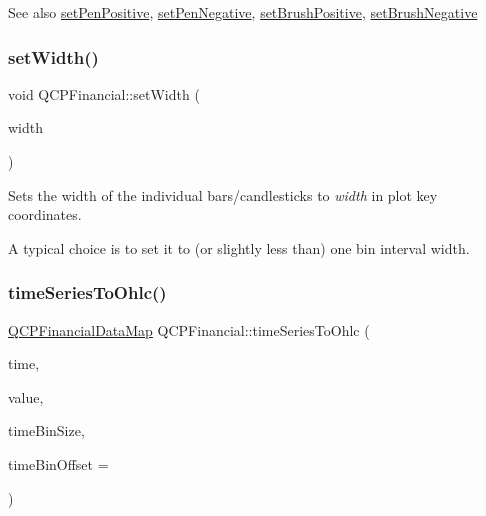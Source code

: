 \begin{DoxySeeAlso}{See also}
\hyperlink{class_q_c_p_financial_ac58aa3adc7a35aab0088764b840683e5}{set\+Pen\+Positive}, \hyperlink{class_q_c_p_financial_afe5c07e94ccea01a75b3a2476993c346}{set\+Pen\+Negative}, \hyperlink{class_q_c_p_financial_a5ebff2b1764efd07cc44942e67821829}{set\+Brush\+Positive}, \hyperlink{class_q_c_p_financial_a8bbdd87629f9144b3ef51af660c0961a}{set\+Brush\+Negative} 
\end{DoxySeeAlso}
\hypertarget{class_q_c_p_financial_a99633f8bac86a61d534ae5eeb1a3068f}{}\label{class_q_c_p_financial_a99633f8bac86a61d534ae5eeb1a3068f} 
\subsubsection{\texorpdfstring{set\+Width()}{setWidth()}}
{\footnotesize\ttfamily void Q\+C\+P\+Financial\+::set\+Width (\begin{DoxyParamCaption}\item[{double}]{width }\end{DoxyParamCaption})}

Sets the width of the individual bars/candlesticks to {\itshape width} in plot key coordinates.

A typical choice is to set it to (or slightly less than) one bin interval width. \hypertarget{class_q_c_p_financial_a0c3453d1c03e320950fdd2df54e3ebc8}{}\label{class_q_c_p_financial_a0c3453d1c03e320950fdd2df54e3ebc8} 
\subsubsection{\texorpdfstring{time\+Series\+To\+Ohlc()}{timeSeriesToOhlc()}}
{\footnotesize\ttfamily \hyperlink{qcustomplot_8h_a745c09823fae0974b50beca9bc3b3d7d}{Q\+C\+P\+Financial\+Data\+Map} Q\+C\+P\+Financial\+::time\+Series\+To\+Ohlc (\begin{DoxyParamCaption}\item[{const Q\+Vector$<$ double $>$ \&}]{time,  }\item[{const Q\+Vector$<$ double $>$ \&}]{value,  }\item[{double}]{time\+Bin\+Size,  }\item[{double}]{time\+Bin\+Offset = {} }\end{DoxyParamCaption})\hspace{0.3cm}{\ttfamily [static]}}

